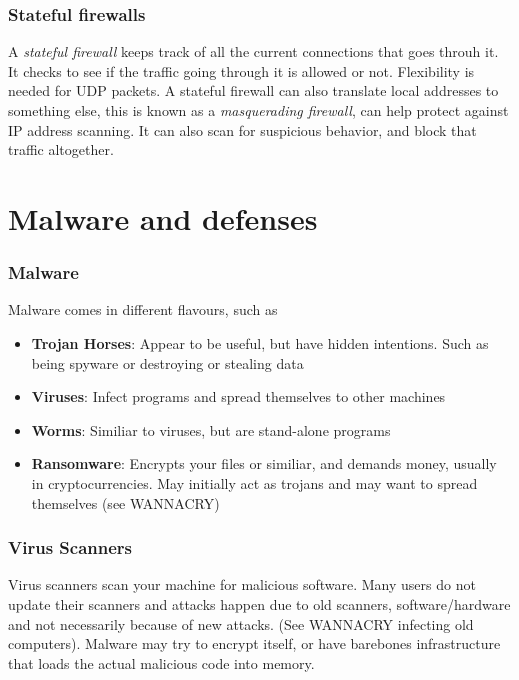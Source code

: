 \documentclass[14pt]{beamer}
\begin{document}
\begin{frame}
    \frametitle{Stateful firewalls}
        A \textit{stateful firewall} keeps track of all the current connections that goes throuh it. It checks to see if the traffic going through it is allowed or not. Flexibility is needed for UDP packets. A stateful firewall can also translate local addresses to something else, this is known as a \textit{masquerading firewall}, can help protect against IP address scanning. It can also scan for suspicious behavior, and block that traffic altogether. 
    

\end{frame}

\section{Malware and defenses}
    \begin{frame}
        \frametitle{Malware}
            Malware comes in different flavours, such as 
                \begin{itemize}
                        \item \textbf{Trojan Horses}: Appear to be useful, but have hidden intentions. Such as being spyware or destroying or stealing data
                        \item \textbf{Viruses}: Infect programs and spread themselves to other machines
                        \item \textbf{Worms}: Similiar to viruses, but are stand-alone programs
                        \item \textbf{Ransomware}: Encrypts your files or similiar, and demands money, usually in cryptocurrencies. May initially act as trojans and may want to spread themselves (see WANNACRY)
                \end{itemize}
    \end{frame}

    \begin{frame}
        \frametitle{Virus Scanners}
            Virus scanners scan your machine for malicious software. Many users do not update their scanners and attacks happen due to old scanners, software/hardware and not necessarily because of new attacks. (See WANNACRY infecting old computers). 
            Malware may try to encrypt itself, or have barebones infrastructure that loads the actual malicious code into memory.
    \end{frame}
\end{document}
